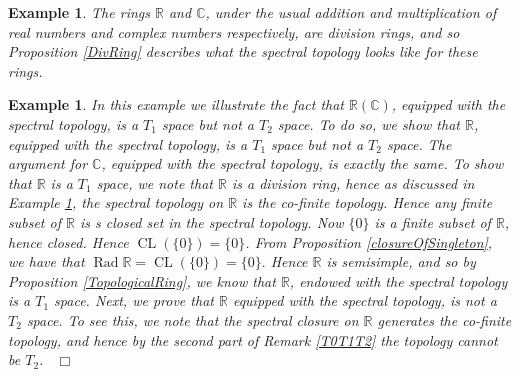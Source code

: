 \documentclass[12pt, oneside]{book}
\newtheorem{example}[theorem]{Example}
\newcommand{\qed}{\hfill ~$\Box$\\}
\def\Rad{\operatorname{Rad}}
\def\CL{\operatorname{CL}}
\begin{document}
\begin{example} \label{Previous}
\normalfont
\noindent The rings $\mathbb{R}$ and $\mathbb{C}$, under the usual addition and multiplication of 
real numbers and complex numbers respectively, are division rings, and so Proposition
\ref{DivRing} describes what the spectral topology looks like for these rings.
\end{example}

\begin{example} 
\normalfont
In this example we illustrate the fact that $\mathbb{R} (\mathbb{C})$, equipped with the spectral 
topology, is a $T_1$ space but not a $T_2$ space. To do so, we show that $\mathbb{R}$, 
equipped with the spectral topology, is a $T_1$ space but not a $T_2$ space. The argument for 
$\mathbb{C}$, equipped with the spectral topology, is exactly the same. 
\vskip 0.3cm
\noindent To show that $\mathbb{R}$ is a $T_1$ space, we note that $\mathbb{R}$ is a division ring, 
hence as discussed in Example \ref{Previous}, the spectral topology on $\mathbb{R}$ is the 
co-finite topology. Hence any finite subset of $\mathbb{R}$ is s closed set in the spectral topology. 
Now $\{0\}$ is a finite subset of $\mathbb{R}$, hence closed. Hence $\CL(\{0\}) = \{0\}$. 
From Proposition \ref{closureOfSingleton}, we have that $\Rad \mathbb{R} = \CL(\{0\}) = \{0\}.$ Hence
$\mathbb{R}$ is semisimple, and so by Proposition \ref{TopologicalRing}, we know that $\mathbb{R}$, 
endowed with the spectral topology is a $T_1$ space.
\vskip 0.3cm
\noindent Next, we prove that $\mathbb{R}$ equipped with the spectral topology, is not a $T_2$ space. 
To see this, we note that the spectral closure on $\mathbb{R}$ generates the co-finite topology, 
and hence by the second part of Remark \ref{T0T1T2} the topology cannot be $T_2$.  \qed

\end{example}
\end{document}
